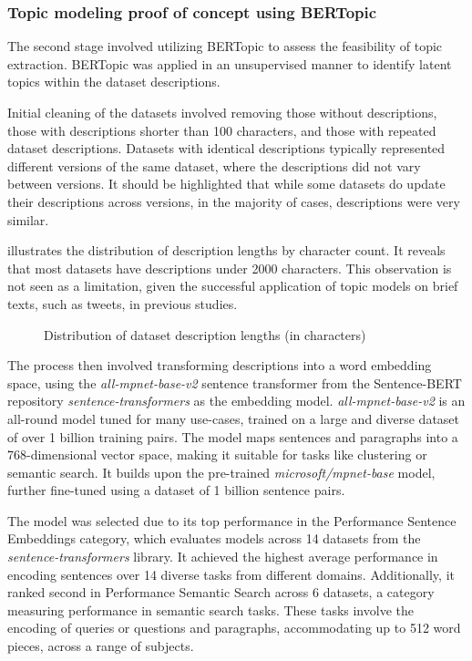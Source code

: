 \documentclass{article}
\begin{document}
\subsubsection{Topic modeling proof of concept using BERTopic}

The second stage involved utilizing BERTopic to assess the feasibility of topic extraction. BERTopic was applied in an unsupervised manner to identify latent topics within the dataset descriptions.

Initial cleaning of the datasets involved removing those without descriptions, those with descriptions shorter than 100 characters, and those with repeated dataset descriptions. Datasets with identical descriptions typically represented different versions of the same dataset, where the descriptions did not vary between versions. It should be highlighted that while some datasets do update their descriptions across versions, in the majority of cases, descriptions were very similar.

 illustrates the distribution of description lengths by character count. It reveals that most datasets have descriptions under 2000 characters. This observation is not seen as a limitation, given the successful application of topic models on brief texts, such as tweets, in previous studies.

\begin{figure}[h] %
    \centering
    
    \caption{Distribution of dataset description lengths (in characters)}
    \label{fig:description_length_histogram}
\end{figure}

The process then involved transforming descriptions into a word embedding space, using the \textit{all-mpnet-base-v2} \cite{noauthor_sentence-transformersall-mpnet-base-v2_2024} sentence transformer from the Sentence-BERT repository \cite{reimers_sentence-bert_2019} \textit{sentence-transformers} as the embedding model. \textit{all-mpnet-base-v2} is an all-round model tuned for many use-cases, trained on a large and diverse dataset of over 1 billion training pairs. The model maps sentences and paragraphs into a 768-dimensional vector space, making it suitable for tasks like clustering or semantic search. It builds upon the pre-trained \textit{microsoft/mpnet-base} \cite{noauthor_microsoftmpnet-base_nodate} model, further fine-tuned using a dataset of 1 billion sentence pairs.

The model was selected due to its top performance in the Performance Sentence Embeddings category, which evaluates models across 14 datasets from the \textit{sentence-transformers} library. It achieved the highest average performance in encoding sentences over 14 diverse tasks from different domains. Additionally, it ranked second in Performance Semantic Search across 6 datasets, a category measuring performance in semantic search tasks. These tasks involve the encoding of queries or questions and paragraphs, accommodating up to 512 word pieces, across a range of subjects.
\end{document}
